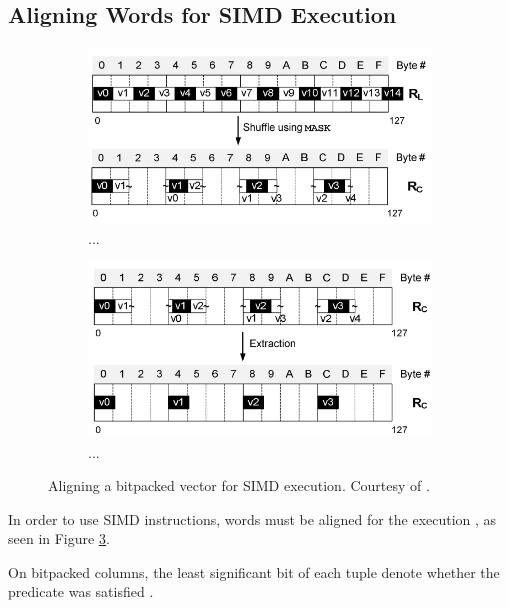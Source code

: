 \subsection{Aligning Words for SIMD Execution}
\label{sub:Aligning words for SIMD execution}
\begin{figure}
  \centering
  \begin{subfigure}{0.45\textwidth}
    \includegraphics[width=\textwidth]{img/simd-align-1.png}
    \caption{...}
    \label{fig:simd-align-1} 
  \end{subfigure}
  \begin{subfigure}{0.45\textwidth}
    \includegraphics[width=\textwidth]{img/simd-align-2.png}
    \caption{...}
    \label{fig:simd-align-2} 
  \end{subfigure}
  \caption{Aligning a bitpacked vector for SIMD execution. Courtesy of \cite{Willhalm2009-hu}.}
  \label{fig:simd-align} 
\end{figure}
In order to use SIMD instructions, words must be aligned for the execution \cite{Willhalm2009-hu}, as seen in Figure \ref{fig:simd-align}.

On bitpacked columns, the least significant bit of each tuple denote whether the predicate was satisfied \cite{Raman2013-em}.

